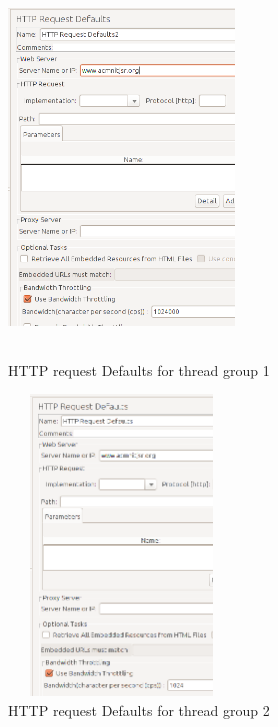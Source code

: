 \documentclass[12pt]{book}
\begin{document}
  \begin{figure}[H]
   \centering
   \includegraphics[width=6cm, height=10cm]{images/bt_3}
   \caption{HTTP request Defaults for thread group 1\label{fig:fig52_JMeter}}
  \end{figure}
  
  \begin{figure}[H]
   \centering
   \includegraphics[width=6cm, height=8cm]{images/bt_2}
   \caption{HTTP request Defaults for thread group 2\label{fig:fig53_JMeter}}
  \end{figure}
  
\end{document}
